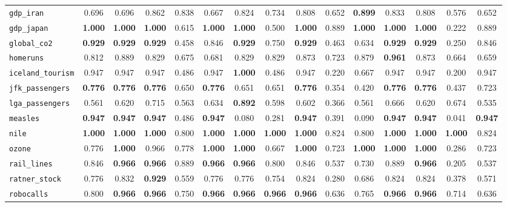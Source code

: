 \begin{tabular}{lcccccccccccccc}
\verb+gdp_iran+ & 0.696 & 0.696 & 0.862 & 0.838 & 0.667 & 0.824 & 0.734 & 0.808 & 0.652 & \textbf{0.899} & 0.833 & 0.808 & 0.576 & 0.652\\
\verb+gdp_japan+ & \textbf{1.000} & \textbf{1.000} & \textbf{1.000} & 0.615 & \textbf{1.000} & \textbf{1.000} & 0.500 & \textbf{1.000} & 0.889 & \textbf{1.000} & \textbf{1.000} & \textbf{1.000} & 0.222 & 0.889\\
\verb+global_co2+ & \textbf{0.929} & \textbf{0.929} & \textbf{0.929} & 0.458 & 0.846 & \textbf{0.929} & 0.750 & \textbf{0.929} & 0.463 & 0.634 & \textbf{0.929} & \textbf{0.929} & 0.250 & 0.846\\
\verb+homeruns+ & 0.812 & 0.889 & 0.829 & 0.675 & 0.681 & 0.829 & 0.829 & 0.873 & 0.723 & 0.879 & \textbf{0.961} & 0.873 & 0.664 & 0.659\\
\verb+iceland_tourism+ & 0.947 & 0.947 & 0.947 & 0.486 & 0.947 & \textbf{1.000} & 0.486 & 0.947 & 0.220 & 0.667 & 0.947 & 0.947 & 0.200 & 0.947\\
\verb+jfk_passengers+ & \textbf{0.776} & \textbf{0.776} & \textbf{0.776} & 0.650 & \textbf{0.776} & 0.651 & 0.651 & \textbf{0.776} & 0.354 & 0.420 & \textbf{0.776} & \textbf{0.776} & 0.437 & 0.723\\
\verb+lga_passengers+ & 0.561 & 0.620 & 0.715 & 0.563 & 0.634 & \textbf{0.892} & 0.598 & 0.602 & 0.366 & 0.561 & 0.666 & 0.620 & 0.674 & 0.535\\
\verb+measles+ & \textbf{0.947} & \textbf{0.947} & \textbf{0.947} & 0.486 & \textbf{0.947} & 0.080 & 0.281 & \textbf{0.947} & 0.391 & 0.090 & \textbf{0.947} & \textbf{0.947} & 0.041 & \textbf{0.947}\\
\verb+nile+ & \textbf{1.000} & \textbf{1.000} & \textbf{1.000} & 0.800 & \textbf{1.000} & \textbf{1.000} & \textbf{1.000} & \textbf{1.000} & 0.824 & 0.800 & \textbf{1.000} & \textbf{1.000} & \textbf{1.000} & 0.824\\
\verb+ozone+ & 0.776 & \textbf{1.000} & 0.966 & 0.778 & \textbf{1.000} & \textbf{1.000} & 0.667 & \textbf{1.000} & 0.723 & \textbf{1.000} & \textbf{1.000} & \textbf{1.000} & 0.286 & 0.723\\
\verb+rail_lines+ & 0.846 & \textbf{0.966} & \textbf{0.966} & 0.889 & \textbf{0.966} & \textbf{0.966} & 0.800 & 0.846 & 0.537 & 0.730 & 0.889 & \textbf{0.966} & 0.205 & 0.537\\
\verb+ratner_stock+ & 0.776 & 0.832 & \textbf{0.929} & 0.559 & 0.776 & 0.776 & 0.754 & 0.824 & 0.280 & 0.686 & 0.824 & 0.824 & 0.378 & 0.571\\
\verb+robocalls+ & 0.800 & \textbf{0.966} & \textbf{0.966} & 0.750 & \textbf{0.966} & \textbf{0.966} & \textbf{0.966} & \textbf{0.966} & 0.636 & 0.765 & \textbf{0.966} & \textbf{0.966} & 0.714 & 0.636\\

\end{tabular}
